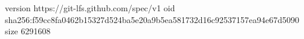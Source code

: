 version https://git-lfs.github.com/spec/v1
oid sha256:f59cc8fa0462b15327d524ba5e20a9b5ea581732d16c92537157ea94e67d5090
size 6291608
